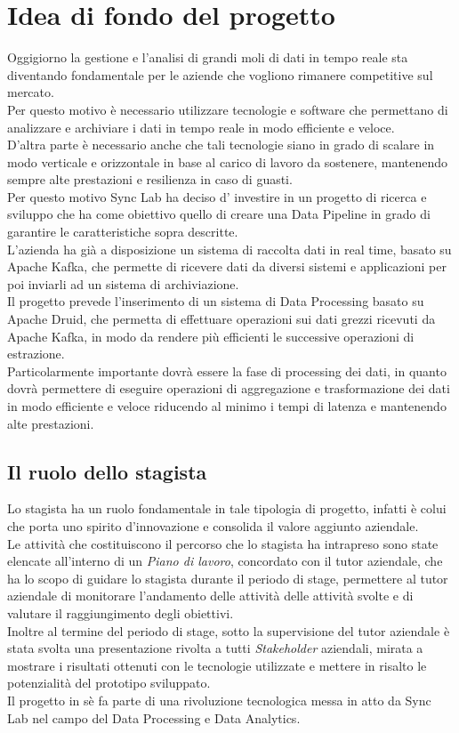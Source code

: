\section{Idea di fondo del progetto}
Oggigiorno la gestione e l'analisi di grandi moli di dati in tempo reale sta diventando fondamentale 
per le aziende che vogliono rimanere competitive sul mercato. \\ 
Per questo motivo è necessario utilizzare tecnologie e software che permettano di analizzare e archiviare 
i dati in tempo reale in modo efficiente e veloce. \\
D'altra parte è necessario anche che tali tecnologie siano in grado di scalare in modo verticale e orizzontale in base al carico 
di lavoro da sostenere, mantenendo sempre alte prestazioni e resilienza in caso di guasti. \\
Per questo motivo Sync Lab ha deciso d' investire in un progetto di ricerca e sviluppo che ha come obiettivo quello di creare 
una \gls{Data Pipeline}{} in grado di garantire le caratteristiche sopra descritte. \\
L'azienda ha già a disposizione un sistema di raccolta dati in real time, basato su Apache Kafka, che permette di ricevere dati da
diversi sistemi e applicazioni per poi inviarli ad un sistema di archiviazione. \\
Il progetto prevede l'inserimento di un sistema di \gls{Data Processing}{} basato su Apache Druid, che permetta di effettuare operazioni sui dati 
grezzi ricevuti da Apache Kafka, in modo da rendere più efficienti le successive operazioni di estrazione.\\
Particolarmente importante dovrà essere la fase di processing dei dati, in quanto dovrà permettere di eseguire operazioni di aggregazione
e trasformazione dei dati in modo efficiente e veloce riducendo al minimo i tempi di latenza e mantenendo alte prestazioni.\\
\subsection{Il ruolo dello stagista}
Lo stagista ha un ruolo fondamentale in tale tipologia di progetto, infatti è colui che porta uno spirito d'innovazione e consolida il valore aggiunto 
aziendale. \\
Le attività che costituiscono il percorso che lo stagista ha intrapreso sono state elencate all'interno di un \textit{Piano di lavoro}, concordato con il tutor aziendale, che ha lo scopo di guidare lo stagista durante il periodo di stage, permettere al 
tutor aziendale di monitorare l'andamento delle attività delle attività svolte e di valutare il raggiungimento degli obiettivi.\\
Inoltre al termine del periodo di stage, sotto la supervisione del tutor aziendale è stata svolta una presentazione rivolta a tutti \textit{Stakeholder} aziendali, mirata a 
mostrare i risultati ottenuti con le tecnologie utilizzate e mettere in risalto le potenzialità del prototipo sviluppato. \\
Il progetto in sè fa parte di una rivoluzione tecnologica messa in atto da Sync Lab nel campo del \gls{Data Processing}{} e \gls{Data Analytics}{}.\\
\pagebreak
